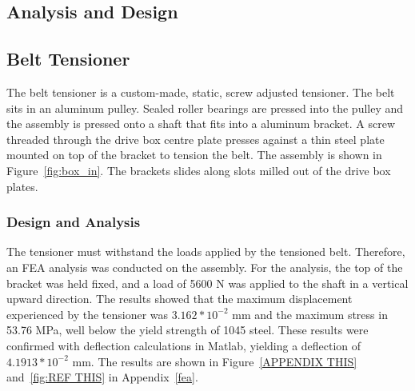 \subsection{Analysis and Design}


\subsection{Belt Tensioner}

The belt tensioner is a custom-made, static, screw adjusted tensioner. The belt sits in an aluminum pulley. Sealed roller bearings are pressed into the pulley and the assembly is pressed onto a shaft that fits into a aluminum bracket. A screw threaded through the drive box centre plate presses against a thin steel plate mounted on top of the bracket to tension the belt. The assembly is shown in Figure~\ref{fig:box_in}. The brackets slides along slots milled out of the drive box plates.

\subsubsection{Design and Analysis}

The tensioner must withstand the loads applied by the tensioned belt. Therefore, an FEA analysis was conducted on the assembly. For the analysis, the top of the bracket was held fixed, and a load of 5600 N was applied to the shaft in a vertical upward direction. The results showed that the maximum displacement experienced by the tensioner was ${3.162*10^{-2}}$ mm and the maximum stress in 53.76 MPa, well below the yield strength of 1045 steel. These results were confirmed with deflection calculations in Matlab, yielding a deflection of ${4.1913*10^{-2}}$ mm. The results are shown in Figure~\ref{APPENDIX THIS} and~\ref{fig:REF THIS} in Appendix~\ref{fea}.


